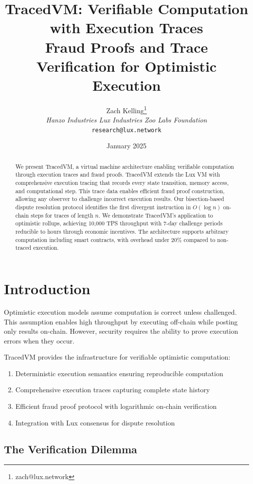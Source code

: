 \documentclass[11pt,a4paper]{article}
\title{TracedVM: Verifiable Computation with Execution Traces\\
\large Fraud Proofs and Trace Verification for Optimistic Execution}
\author{Zach Kelling\thanks{zach@lux.network} \\ \textit{Hanzo Industries \quad Lux Industries \quad Zoo Labs Foundation} \\ \texttt{research@lux.network}}
\date{January 2025}
\begin{document}
\maketitle

\begin{abstract}
We present TracedVM, a virtual machine architecture enabling verifiable computation through execution traces and fraud proofs. TracedVM extends the Lux VM with comprehensive execution tracing that records every state transition, memory access, and computational step. This trace data enables efficient fraud proof construction, allowing any observer to challenge incorrect execution results. Our bisection-based dispute resolution protocol identifies the first divergent instruction in $O(\log n)$ on-chain steps for traces of length $n$. We demonstrate TracedVM's application to optimistic rollups, achieving 10,000 TPS throughput with 7-day challenge periods reducible to hours through economic incentives. The architecture supports arbitrary computation including smart contracts, with overhead under 20\% compared to non-traced execution.
\end{abstract}

\section{Introduction}

Optimistic execution models assume computation is correct unless challenged. This assumption enables high throughput by executing off-chain while posting only results on-chain. However, security requires the ability to prove execution errors when they occur.

TracedVM provides the infrastructure for verifiable optimistic computation:

\begin{enumerate}
    \item Deterministic execution semantics ensuring reproducible computation
    \item Comprehensive execution traces capturing complete state history
    \item Efficient fraud proof protocol with logarithmic on-chain verification
    \item Integration with Lux consensus for dispute resolution
\end{enumerate}

\subsection{The Verification Dilemma}
\end{document}
